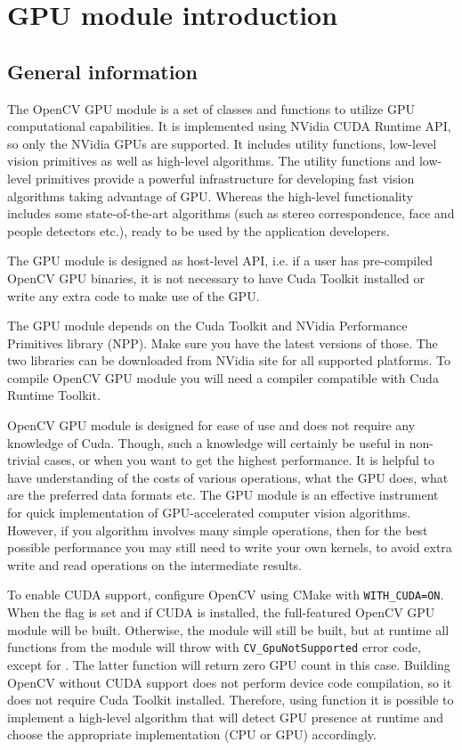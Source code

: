 \section {GPU module introduction}

\subsection{General information}

The OpenCV GPU module is a set of classes and functions to utilize GPU computational capabilities. It is implemented using NVidia CUDA Runtime API, so only the NVidia GPUs are supported. It includes utility functions, low-level vision primitives as well as high-level algorithms. The utility functions and low-level primitives provide a powerful infrastructure for developing fast vision algorithms taking advantage of GPU. Whereas the high-level functionality includes some state-of-the-art algorithms (such as stereo correspondence, face and people detectors etc.), ready to be used by the application developers.   

The GPU module is designed as host-level API, i.e. if a user has pre-compiled OpenCV GPU binaries, it is not necessary to have Cuda Toolkit installed or write any extra code to make use of the GPU.

The GPU module depends on the Cuda Toolkit and NVidia Performance Primitives library (NPP). Make sure you have the latest versions of those. The two libraries can be downloaded from NVidia site for all supported platforms. To compile OpenCV GPU module you will need a compiler compatible with Cuda Runtime Toolkit.

OpenCV GPU module is designed for ease of use and does not require any knowledge of Cuda. Though, such a knowledge will certainly be useful in non-trivial cases, or when you want to get the highest performance. It is helpful to have understanding of the costs of various operations, what the GPU does, what are the preferred data formats etc. The GPU module is an effective instrument for quick implementation of GPU-accelerated computer vision algorithms. However, if you algorithm involves many simple operations, then for the best possible performance you may still need to write your own kernels, to avoid extra write and read operations on the intermediate results.

To enable CUDA support, configure OpenCV using CMake with \texttt{WITH\_CUDA=ON}. When the flag is set and if CUDA is installed, the full-featured OpenCV GPU module will be built. Otherwise, the module will still be built, but at runtime all functions from the module will throw  with \texttt{CV\_GpuNotSupported} error code, except for . The latter function will return zero GPU count in this case. Building OpenCV without CUDA support does not perform device code compilation, so it does not require Cuda Toolkit installed. Therefore, using   function it is possible to implement a high-level algorithm that will detect GPU presence at runtime and choose the appropriate implementation (CPU or GPU) accordingly.

